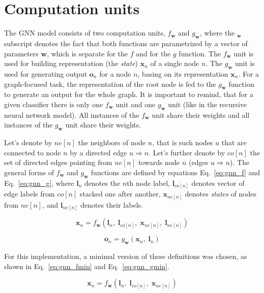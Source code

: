 \section{Computation units}
The GNN model consists of two computation units, $f_{\bm{w}}$ and $g_{\bm{w}}$, where the $_{\bm{w}}$ subscript denotes the fact that both functions are parametrized by a vector of parameters $\bm{w}$, which is separate for the $f$ and for the $g$ function. The $f_{\bm{w}}$ unit is used for building representation (the \emph{state}) $\bm{x}_n$ of a single node $n$. The $g_{\bm{w}}$ unit is used for generating output $\bm{o}_n$ for a node $n$, basing on its representation $\bm{x}_n$. For a graph-focused task, the representation of the root node is fed to the $g_{\bm{w}}$ function to generate an output for the whole graph. It is important to remind, that for a given classifier there is only one $f_{\bm{w}}$ unit and one $g_{\bm{w}}$ unit (like in the recursive neural network model). All instances of the $f_{\bm{w}}$ unit share their weights and all instances of the $g_{\bm{w}}$ unit share their weights.

Let's denote by $ne[n]$ the neighbors of node $n$, that is such nodes $u$ that are connected to node $n$ by a directed edge $u \Rightarrow n$. Let's further denote by $co[n]$ the set of directed edges pointing from $ne[n]$ towards node $n$ (edges $u \Rightarrow n$). The general forms of $f_{\bm{w}}$ and $g_{\bm{w}}$ functions are defined by equations Eq.~\ref{eq:gnn_f} and Eq.~\ref{eq:gnn_g}, where $\bm{l}_n$ denotes the $n$th node label, $\bm{l}_{co[n]}$ denotes vector of edge labels from $co[n]$ stacked one after another, $\bm{x}_{ne[n]}$ denotes \emph{states} of nodes from $ne[n]$, and $\bm{l}_{ne[n]}$ denotes their labels.

\begin{equation}
\bm{x}_n = f_{\bm{w}}(\bm{l}_n, \; \bm{l}_{co[n]}, \; \bm{x}_{ne[n]}, \; \bm{l}_{ne[n]})
\label{eq:gnn_f}
\end{equation}

\begin{equation}
\bm{o}_n = g_{\bm{w}}(\bm{x}_n, \; \bm{l}_n)
\label{eq:gnn_g}
\end{equation}

\noindent For this implementation, a minimal version of these definitions was chosen, as shown in Eq.~\ref{eq:gnn_fmin} and Eq.~\ref{eq:gnn_gmin}.

\begin{equation}
\bm{x}_n = f_{\bm{w}}(\bm{l}_n, \; \bm{l}_{co[n]}, \; \bm{x}_{ne[n]})
\label{eq:gnn_fmin}
\end{equation}

